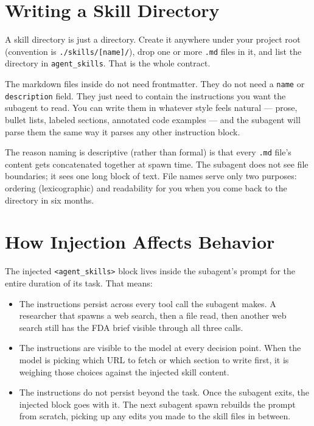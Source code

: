 \documentclass[11pt,letterpaper,openany]{book}
\begin{document}
\section{Writing a Skill Directory}

A skill directory is just a directory. Create it anywhere under your
project root (convention is \texttt{./skills/[name]/}), drop one or
more \texttt{.md} files in it, and list the directory in
\texttt{agent\_skills}. That is the whole contract.

The markdown files inside do not need frontmatter. They do not need a
\texttt{name} or \texttt{description} field. They just need to contain
the instructions you want the subagent to read. You can write them in
whatever style feels natural --- prose, bullet lists, labeled sections,
annotated code examples --- and the subagent will parse them the same
way it parses any other instruction block.

The reason naming is descriptive (rather than formal) is that every
\texttt{.md} file's content gets concatenated together at spawn time.
The subagent does not see file boundaries; it sees one long block of
text. File names serve only two purposes: ordering (lexicographic) and
readability for you when you come back to the directory in six months.

\section{How Injection Affects Behavior}

The injected \texttt{<agent\_skills>} block lives inside the subagent's
prompt for the entire duration of its task. That means:

\begin{itemize}
\item The instructions persist across every tool call the subagent makes.
A researcher that spawns a web search, then a file read, then another
web search still has the FDA brief visible through all three calls.
\item The instructions are visible to the model at every decision point.
When the model is picking which URL to fetch or which section to write
first, it is weighing those choices against the injected skill content.
\item The instructions do not persist beyond the task. Once the subagent
exits, the injected block goes with it. The next subagent spawn rebuilds
the prompt from scratch, picking up any edits you made to the skill
files in between.
\end{itemize}
\end{document}
